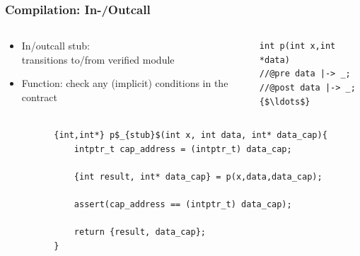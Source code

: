 \documentclass{beamer}
\begin{document}
\begin{frame}[fragile]
\frametitle{Compilation: In-/Outcall}

\begin{columns}
\begin{column}{0.55\textwidth}
\begin{itemize}
\item In/outcall stub:\\transitions to/from verified module
\item Function: check any (implicit) conditions in the contract
\end{itemize}
\end{column}
\begin{column}{0.42\textwidth}
\begin{lstlisting}[style=CStyle, captionpos = t]
int p(int x,int *data)
//@pre data |-> _; 
//@post data |-> _;
{$\ldots$}
\end{lstlisting}
\end{column}
\end{columns}
\vspace{-1em}

\begin{columns}
\begin{column}{0.15\textwidth}
\end{column}
\begin{column}{0.90\textwidth}
\begin{figure}[h]
  \centering
\begin{lstlisting}[style=CStyleNoNum, captionpos = t]
{int,int*} p$_{stub}$(int x, int data, int* data_cap){
	intptr_t cap_address = (intptr_t) data_cap;
	
	{int result, int* data_cap} = p(x,data,data_cap);
	
	assert(cap_address == (intptr_t) data_cap);
	
	return {result, data_cap};
}
\end{lstlisting}
\end{figure}
\end{column}
\end{columns}
\end{frame}
\end{document}
